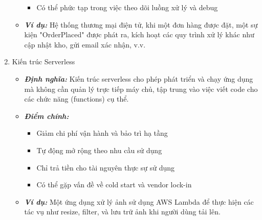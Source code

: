 \begin{enumerate}
\begin{itemize}
\begin{itemize}
            \item Có thể phức tạp trong việc theo dõi luồng xử lý và debug
        \end{itemize}
        \item \textbf{\textit{Ví dụ:}} Hệ thống thương mại điện tử, khi một đơn hàng được đặt, một sự kiện "OrderPlaced" được phát ra, kích hoạt các quy trình xử lý khác như cập nhật kho, gửi email xác nhận, v.v.
    \end{itemize}
    \item Kiến trúc Serverless
    \begin{itemize}
        \item \textbf{\textit{Định nghĩa:}} Kiến trúc serverless cho phép phát triển và chạy ứng dụng mà không cần quản lý trực tiếp máy chủ, tập trung vào việc viết code cho các chức năng (functions) cụ thể.
        \item \textbf{\textit{Điểm chính:}} 
        \begin{itemize}
            \item Giảm chi phí vận hành và bảo trì hạ tầng
            \item Tự động mở rộng theo nhu cầu sử dụng
            \item Chỉ trả tiền cho tài nguyên thực sự sử dụng
            \item Có thể gặp vấn đề về cold start và vendor lock-in
        \end{itemize}
        \item \textbf{\textit{Ví dụ:}} Một ứng dụng xử lý ảnh sử dụng AWS Lambda để thực hiện các tác vụ như resize, filter, và lưu trữ ảnh khi người dùng tải lên.
    \end{itemize}
\end{enumerate}

